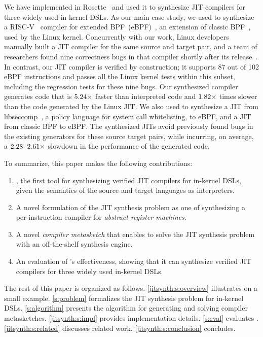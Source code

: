 We have implemented \jitsynth in Rosette~\cite{torlak:rosette} and used it to
synthesize JIT compilers for three widely used in-kernel DSLs. As our main case
study, we used \jitsynth to synthesize a RISC-V~\cite{riscv:isa} compiler for
extended BPF~(eBPF)~\cite{fleming:ebpf}, an extension of classic
BPF~\cite{mccanne:bpf}, used by the Linux kernel. Concurrently with our work,
Linux developers manually built a JIT compiler for the same source and target
pair, and a team of researchers found nine correctness bugs in that compiler
shortly after its release~\cite{nelson:serval}. In contrast, our JIT compiler is
verified by construction; it supports 87 out of 102 eBPF instructions and passes
all the Linux kernel tests within this subset, including the regression tests
for these nine bugs. Our synthesized compiler generates code that is
$5.24\times$ faster than interpreted code and
$1.82\times$ times slower than the code generated by the Linux
JIT\@. We also used  \jitsynth to synthesize a JIT from
libseccomp~\cite{edge:libseccomp}, a policy language for system call
whitelisting, to eBPF, and a JIT from classic BPF to eBPF\@. The synthesized
JITs avoid previously found bugs in the existing generators for these source
target pairs, while incurring, on average, a
$2.28$--$2.61\times$ slowdown in the performance of the
generated code.\tighten


To summarize, this paper makes the following contributions:
\begin{enumerate}
    \item \jitsynth, the first tool for synthesizing verified JIT compilers for
    in-kernel DSLs, given the semantics of the source and target languages as
    interpreters.\tighten
    \item A novel formulation of the JIT synthesis problem as one of
    synthesizing a per-instruction compiler for \emph{abstract register
    machines}.\tighten
    \item A novel \emph{compiler metasketch} that enables \jitsynth to solve the JIT
    synthesis problem with an off-the-shelf synthesis engine.
    \item An evaluation of \jitsynth's effectiveness, showing that it can
    synthesize verified JIT compilers for three widely used in-kernel DSLs.
\end{enumerate}

The rest of this paper is organized as follows.
%
\autoref{jitsynth:s:overview} illustrates \jitsynth on a small example.
%
\autoref{s:problem} formalizes the JIT synthesis problem for in-kernel DSLs.
%
\autoref{s:algorithm} presents the \jitsynth algorithm for generating and
solving compiler metasketches.
%
\autoref{jitsynth:s:impl} provides implementation details.
%
\autoref{s:eval} evaluates \jitsynth.
%
\autoref{jitsynth:s:related} discusses related work.
\autoref{jitsynth:s:conclusion} concludes.\tighten
